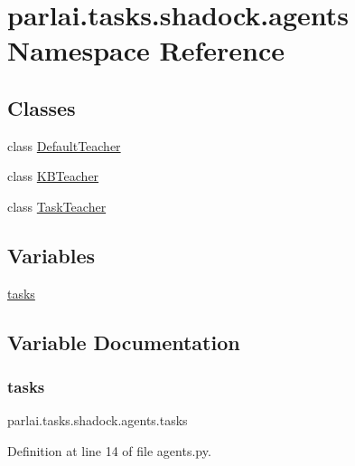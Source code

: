 \hypertarget{namespaceparlai_1_1tasks_1_1shadock_1_1agents}{}\section{parlai.\+tasks.\+shadock.\+agents Namespace Reference}
\label{namespaceparlai_1_1tasks_1_1shadock_1_1agents}
\subsection*{Classes}
\begin{DoxyCompactItemize}
\item 
class \hyperlink{classparlai_1_1tasks_1_1shadock_1_1agents_1_1DefaultTeacher}{Default\+Teacher}
\item 
class \hyperlink{classparlai_1_1tasks_1_1shadock_1_1agents_1_1KBTeacher}{K\+B\+Teacher}
\item 
class \hyperlink{classparlai_1_1tasks_1_1shadock_1_1agents_1_1TaskTeacher}{Task\+Teacher}
\end{DoxyCompactItemize}
\subsection*{Variables}
\begin{DoxyCompactItemize}
\item 
\hyperlink{namespaceparlai_1_1tasks_1_1shadock_1_1agents_adb8d80657572c88eb0c0c73bc1ea2cdf}{tasks}
\end{DoxyCompactItemize}


\subsection{Variable Documentation}
\mbox{\label{namespaceparlai_1_1tasks_1_1shadock_1_1agents_adb8d80657572c88eb0c0c73bc1ea2cdf}} 
\subsubsection{\texorpdfstring{tasks}{tasks}}
{\footnotesize\ttfamily parlai.\+tasks.\+shadock.\+agents.\+tasks}



Definition at line 14 of file agents.\+py.


